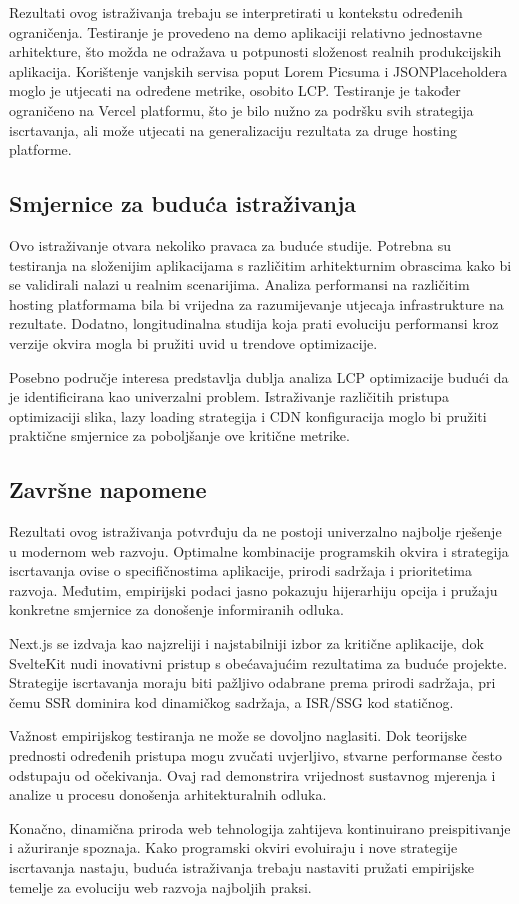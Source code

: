 Rezultati ovog istraživanja trebaju se interpretirati u kontekstu određenih ograničenja. Testiranje je provedeno na demo aplikaciji relativno jednostavne arhitekture, što možda ne odražava u potpunosti složenost realnih produkcijskih aplikacija. Korištenje vanjskih servisa poput Lorem Picsuma i JSONPlaceholdera moglo je utjecati na određene metrike, osobito LCP. Testiranje je također ograničeno na Vercel platformu, što je bilo nužno za podršku svih strategija iscrtavanja, ali može utjecati na generalizaciju rezultata za druge hosting platforme.

\subsection{Smjernice za buduća istraživanja}

Ovo istraživanje otvara nekoliko pravaca za buduće studije. Potrebna su testiranja na složenijim aplikacijama s različitim arhitekturnim obrascima kako bi se validirali nalazi u realnim scenarijima. Analiza performansi na različitim hosting platformama bila bi vrijedna za razumijevanje utjecaja infrastrukture na rezultate. Dodatno, longitudinalna studija koja prati evoluciju performansi kroz verzije okvira mogla bi pružiti uvid u trendove optimizacije.

Posebno područje interesa predstavlja dublja analiza LCP optimizacije budući da je identificirana kao univerzalni problem. Istraživanje različitih pristupa optimizaciji slika, lazy loading strategija i CDN konfiguracija moglo bi pružiti praktične smjernice za poboljšanje ove kritične metrike.

\subsection{Završne napomene}

Rezultati ovog istraživanja potvrđuju da ne postoji univerzalno najbolje rješenje u modernom web razvoju. Optimalne kombinacije programskih okvira i strategija iscrtavanja ovise o specifičnostima aplikacije, prirodi sadržaja i prioritetima razvoja. Međutim, empirijski podaci jasno pokazuju hijerarhiju opcija i pružaju konkretne smjernice za donošenje informiranih odluka.

Next.js se izdvaja kao najzreliji i najstabilniji izbor za kritične aplikacije, dok SvelteKit nudi inovativni pristup s obećavajućim rezultatima za buduće projekte. Strategije iscrtavanja moraju biti pažljivo odabrane prema prirodi sadržaja, pri čemu SSR dominira kod dinamičkog sadržaja, a ISR/SSG kod statičnog.

Važnost empirijskog testiranja ne može se dovoljno naglasiti. Dok teorijske prednosti određenih pristupa mogu zvučati uvjerljivo, stvarne performanse često odstupaju od očekivanja. Ovaj rad demonstrira vrijednost sustavnog mjerenja i analize u procesu donošenja arhitekturalnih odluka.

Konačno, dinamična priroda web tehnologija zahtijeva kontinuirano preispitivanje i ažuriranje spoznaja. Kako programski okviri evoluiraju i nove strategije iscrtavanja nastaju, buduća istraživanja trebaju nastaviti pružati empirijske temelje za evoluciju web razvoja najboljih praksi.
